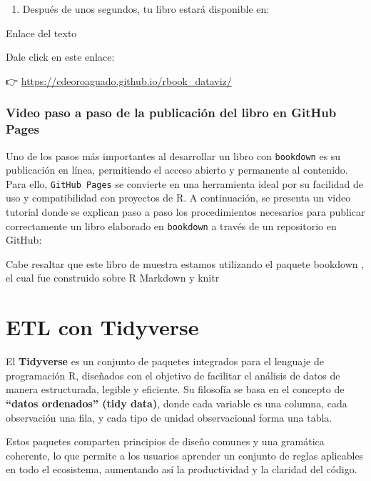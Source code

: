 \documentclass[
]{book}
\providecommand{\tightlist}{%
  \setlength{\itemsep}{0pt}\setlength{\parskip}{0pt}}
\begin{document}
\begin{enumerate}
\def\labelenumi{\arabic{enumi}.}
\setcounter{enumi}{5}
\tightlist
\item
  Después de unos segundos, tu libro estará disponible en:
\end{enumerate}

{} Enlace del texto

Dale click en este enlace:

👉 \url{https://cdeoroaguado.github.io/rbook_dataviz/}

\subsection{Video paso a paso de la publicación del libro en GitHub Pages}\label{video-paso-a-paso-de-la-publicaciuxf3n-del-libro-en-github-pages}

Uno de los pasos más importantes al desarrollar un libro con \texttt{bookdown} es su publicación en línea, permitiendo el acceso abierto y permanente al contenido. Para ello, \texttt{GitHub\ Pages} se convierte en una herramienta ideal por su facilidad de uso y compatibilidad con proyectos de R. A continuación, se presenta un video tutorial donde se explican paso a paso los procedimientos necesarios para publicar correctamente un libro elaborado en \texttt{bookdown} a través de un repositorio en GitHub:

Cabe resaltar que este libro de muestra estamos utilizando el paquete bookdown \citep{R-bookdown}, el cual fue construido sobre R Markdown y knitr \citep{xie2015}

\chapter{ETL con Tidyverse}\label{etltidyverse}

El \textbf{Tidyverse} es un conjunto de paquetes integrados para el lenguaje de programación R, diseñados con el objetivo de facilitar el análisis de datos de manera estructurada, legible y eficiente. Su filosofía se basa en el concepto de \textbf{``datos ordenados'' (tidy data)}, donde cada variable es una columna, cada observación una fila, y cada tipo de unidad observacional forma una tabla.

Estos paquetes comparten principios de diseño comunes y una gramática coherente, lo que permite a los usuarios aprender un conjunto de reglas aplicables en todo el ecosistema, aumentando así la productividad y la claridad del código.
\end{document}
